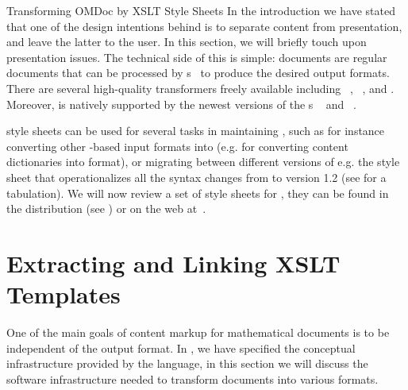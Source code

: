 
\begin{omgroup}[id=transform-xsl,short=Transforming OMDoc]
                           {Transforming OMDoc by XSLT Style Sheets}
In the introduction we have stated that one of the design intentions behind
{\omdoc} is to separate content from presentation, and leave the latter to the
user. In this section, we will briefly touch upon presentation issues. The
technical side of this is simple: {\omdoc} documents are regular {\xml} documents
that can be processed by {\xslt} {s}~\cite{Clark:xslt99} to
produce the desired output formats. There are several high-quality {\xslt}
transformers freely available including {}~\cite{saxon_web},
{}~\cite{xalan_web}, and {}\cite{xsltproc_web}.
Moreover, {\xslt} is natively supported by the newest versions of the
{}s {\msie}~\cite{ie_web} and
{\mozilla}~\cite{mozilla_web}.

{\xslt} style sheets can be used for several tasks in maintaining {\omdoc}, such as for
instance converting other {\xml}-based input formats into {\omdoc} (e.g.
{} for converting {\openmath} content dictionaries into {\omdoc} format), or migrating between different versions of {\omdoc}
e.g. the style sheet {} that operationalizes all the
syntax changes from {} to version 1.2 (see {} for a
tabulation).  We will now review a set of {\xslt} style sheets for {\omdoc}, they can be
found in the {\omdoc} distribution (see {}) or on the web
at~\cite{OMDocXSL:URL}.

\section{Extracting and Linking XSLT Templates}\label{sec:extract-link-xslt}
One of the main goals of content markup for mathematical documents is to be
independent of the output format. In {}, we have specified the
conceptual infrastructure provided by the {\omdoc} language, in this section we
will discuss the software infrastructure needed to transform {\omdoc} documents
into various formats.


\end{omgroup}
